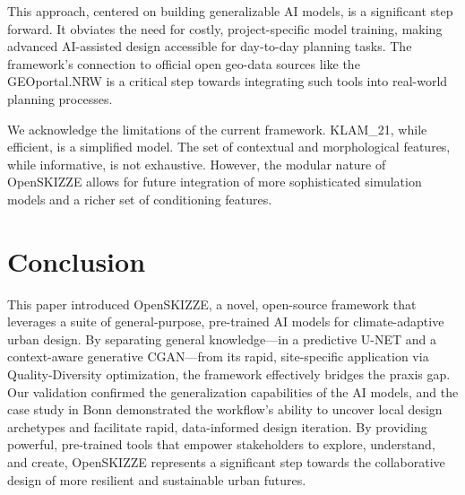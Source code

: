 \documentclass[times,final]{elsarticle}
\begin{document}
This approach, centered on building generalizable AI models, is a significant step forward. It obviates the need for costly, project-specific model training, making advanced AI-assisted design accessible for day-to-day planning tasks. The framework's connection to official open geo-data sources like the GEOportal.NRW is a critical step towards integrating such tools into real-world planning processes.

We acknowledge the limitations of the current framework. KLAM\_21, while efficient, is a simplified model. The set of contextual and morphological features, while informative, is not exhaustive. However, the modular nature of OpenSKIZZE allows for future integration of more sophisticated simulation models and a richer set of conditioning features.

\section{Conclusion}
This paper introduced OpenSKIZZE, a novel, open-source framework that leverages a suite of general-purpose, pre-trained AI models for climate-adaptive urban design. By separating general knowledge—in a predictive U-NET and a context-aware generative CGAN—from its rapid, site-specific application via Quality-Diversity optimization, the framework effectively bridges the praxis gap. Our validation confirmed the generalization capabilities of the AI models, and the case study in Bonn demonstrated the workflow's ability to uncover local design archetypes and facilitate rapid, data-informed design iteration. By providing powerful, pre-trained tools that empower stakeholders to explore, understand, and create, OpenSKIZZE represents a significant step towards the collaborative design of more resilient and sustainable urban futures.



\end{document}

